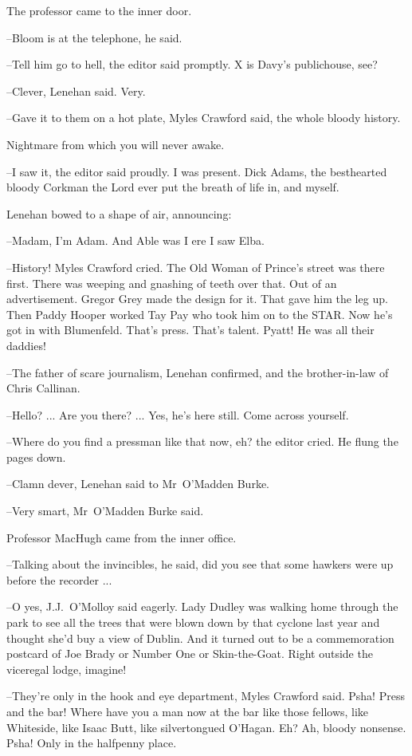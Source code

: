 The professor came to the inner door.

--Bloom is at the telephone,
he said.

--Tell him go to hell,
the editor said promptly.
X is Davy's publichouse,
see?



--Clever,
Lenehan said.
Very.

--Gave it to them on a hot plate,
Myles Crawford said,
the whole bloody history.

Nightmare from which you will never awake.

--I saw it,
the editor said proudly.
I was present.
Dick Adams, the besthearted bloody Corkman the Lord ever put the breath of life in,
and myself.

Lenehan bowed to a shape of air,
announcing:

--Madam,
I'm Adam.
And Able was I ere I saw Elba.

--History!
Myles Crawford cried.
The Old Woman of Prince's street was there first.
There was weeping and gnashing of teeth over that.
Out of an advertisement.
Gregor Grey made the design for it.
That gave him the leg up.
Then Paddy Hooper worked Tay Pay who took him on to the STAR.
Now he's got in with Blumenfeld.
That's press.
That's talent.
Pyatt!
He was all their daddies!

--The father of scare journalism,
Lenehan confirmed,
and the brother-in-law of Chris Callinan.

--Hello? ...
Are you there? ...
Yes, he's here still.
Come across yourself.

--Where do you find a pressman like that now, eh?
the editor cried.
He flung the pages down.

--Clamn dever,
Lenehan said to Mr~O'Madden Burke.

--Very smart,
Mr~O'Madden Burke said.

Professor MacHugh came from the inner office.

--Talking about the invincibles,
he said,
did you see that some hawkers were up before the recorder ...

--O yes,
J.J.~O'Molloy said eagerly.
Lady Dudley was walking home through the park
to see all the trees that were blown down by that cyclone last year
and thought she'd buy a view of Dublin.
And it turned out to be a commemoration postcard
of Joe Brady or Number One or Skin-the-Goat.
Right outside the viceregal lodge,
imagine!

--They're only in the hook and eye department,
Myles Crawford said.
Psha!
Press and the bar!
Where have you a man now at the bar like those fellows,
like Whiteside,
like Isaac Butt,
like silvertongued O'Hagan.
Eh?
Ah, bloody nonsense.
Psha!
Only in the halfpenny place.

